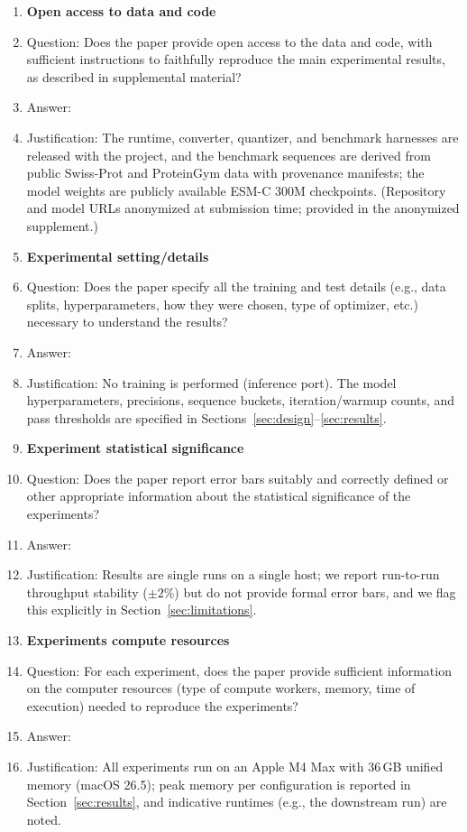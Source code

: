 \documentclass{article}
\newif\ifshowartifacts
\begin{document}
\begin{enumerate}
\item {\bf Open access to data and code}
    \item[] Question: Does the paper provide open access to the data and code, with sufficient instructions to faithfully reproduce the main experimental results, as described in supplemental material?
    \item[] Answer: \answerYes{}
    \item[] Justification: The runtime, converter, quantizer, and benchmark harnesses are released with the project, and the benchmark sequences are derived from public Swiss-Prot and ProteinGym data with provenance manifests; the model weights are publicly available ESM-C 300M checkpoints. \ifshowartifacts Code: \url{https://github.com/AnanyaP-WDW/esmc.cpp}; pre-converted GGUF models and model card: \url{https://huggingface.co/AnanyaPathak/esmc-300m-gguf}. \else (Repository and model URLs anonymized at submission time; provided in the anonymized supplement.)\fi

\item {\bf Experimental setting/details}
    \item[] Question: Does the paper specify all the training and test details (e.g., data splits, hyperparameters, how they were chosen, type of optimizer, etc.) necessary to understand the results?
    \item[] Answer: \answerYes{}
    \item[] Justification: No training is performed (inference port). The model hyperparameters, precisions, sequence buckets, iteration/warmup counts, and pass thresholds are specified in Sections~\ref{sec:design}--\ref{sec:results}.

\item {\bf Experiment statistical significance}
    \item[] Question: Does the paper report error bars suitably and correctly defined or other appropriate information about the statistical significance of the experiments?
    \item[] Answer: \answerNo{}
    \item[] Justification: Results are single runs on a single host; we report run-to-run throughput stability ($\pm2\%$) but do not provide formal error bars, and we flag this explicitly in Section~\ref{sec:limitations}.

\item {\bf Experiments compute resources}
    \item[] Question: For each experiment, does the paper provide sufficient information on the computer resources (type of compute workers, memory, time of execution) needed to reproduce the experiments?
    \item[] Answer: \answerYes{}
    \item[] Justification: All experiments run on an Apple M4 Max with 36\,GB unified memory (macOS 26.5); peak memory per configuration is reported in Section~\ref{sec:results}, and indicative runtimes (e.g., the downstream run) are noted.


\end{enumerate}
\end{document}
